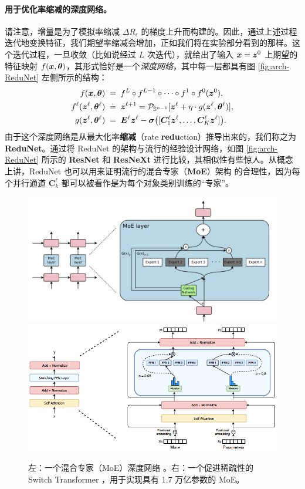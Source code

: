 \documentclass[../../book-main.tex]{subfiles}
\begin{document}
\paragraph{用于优化率缩减的深度网络。} 请注意，增量是为了模拟率缩减 $\Delta R_\epsilon$ 的梯度上升而构建的。因此，通过上述过程迭代地变换特征，我们期望率缩减会增加，正如我们将在实验部分看到的那样。这个迭代过程，一旦收敛（比如说经过 $L$ 次迭代），就给出了输入 $\bm{x} = \bm{z}^0$ 上期望的特征映射 $f(\bm{x}, \bm \theta)$，其形式恰好是一个{\em 深度网络}，其中每一层都具有图 \ref{fig:arch-ReduNet} 左侧所示的结构：
\begin{equation}\label{eqn:ReduNet}
\begin{aligned}
f(\bm{x}, \bm \theta)\; =&  \;\;f^L \circ f^{L-1} \circ  \cdots \circ f^1 \circ
    f^0(\bm{z}^0),  \\
f^\ell(\bm{z}^\ell, \bm \theta^\ell) \; \doteq & \;\; \bm{z}^{\ell+1} = \mathcal{P}_{\mathbb{S}^{n-1}}[\bm{z}^{\ell} + \eta\cdot g(\bm{z}^{\ell}, \bm \theta^{\ell})], \\
g(\bm{z}^{\ell}, \bm \theta^{\ell}) \; =&\;\; \bm E^{\ell} \bm{z}^{\ell} -  \bm \sigma\big([\bm{C}^{\ell}_{1} \bm{z}^{\ell}, \dots, \bm{C}^{\ell}_{K} \bm{z}^{\ell}]\big).
\end{aligned}
\end{equation}
由于这个深度网络是从最大化率\textbf{缩减}（rate \textbf{redu}ction）推导出来的，我们称之为 \textbf{ReduNet}。通过将 ReduNet 的架构与流行的经验设计网络，如图 \ref{fig:arch-ReduNet} 所示的 \textbf{ResNet} 和 \textbf{ResNeXt} 进行比较，其相似性有些惊人。从概念上讲，ReduNet 也可以用来证明流行的混合专家（\textbf{MoE}）架构 \cite{MoE} 的合理性，因为每个并行通道 $\bm{C}^{\ell}_k$ 都可以被看作是为每个对象类别训练的“专家”。

\begin{figure}[t]
    \centering
    \includegraphics[width=0.45\linewidth]{figs_chap4/MoE.png} \hspace{5mm}
    \includegraphics[width=0.45\linewidth]{figs_chap4/switched-transformer.png}
    \caption{左：一个混合专家（MoE）深度网络 \cite{MoE}。右：一个促进稀疏性的 Switch Transformer \cite{Fedus-2022}，用于实现具有 1.7 万亿参数的 MoE。}
    \label{fig:enter-label}
\end{figure}
\end{document}
